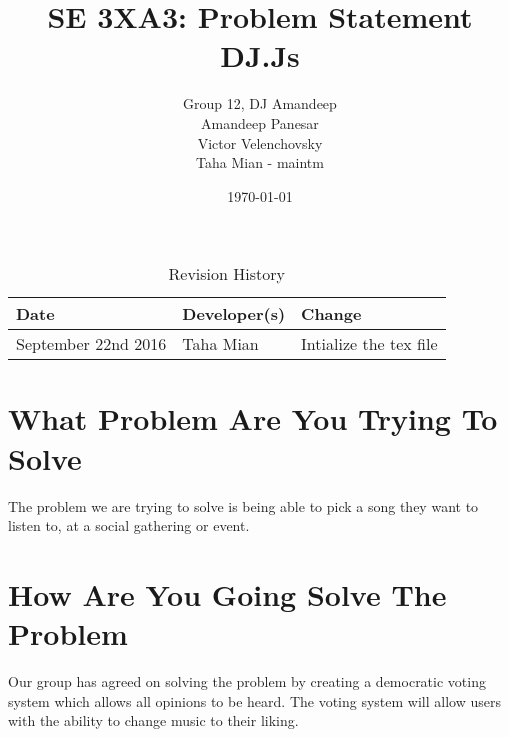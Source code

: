 \documentclass[11pt,fleqn]{article}
\title{SE 3XA3: Problem Statement\\DJ.Js}
\author{Group 12, DJ Amandeep\\
Amandeep Panesar \\ Victor Velenchovsky \\ Taha Mian - maintm}
\date{\today}
\begin{document}
\begin{table}[hp]
\caption{Revision History} \label{TblRevisionHistory}
\begin{tabularx}{\textwidth}{llX}
\toprule
\textbf{Date} & \textbf{Developer(s)} & \textbf{Change}\\
\midrule
September 22nd 2016 & Taha Mian & Intialize the tex file\\

\bottomrule
\end{tabularx}
\end{table}
\maketitle
\section{What Problem Are You Trying To Solve}
The problem we are trying to solve is being able to pick a song they want to listen to, at a social gathering or event.
\section{How Are You Going Solve The Problem}
Our group has agreed on solving the problem by creating a democratic voting system which allows all opinions to be heard. The voting system will allow users with the ability to change music to their liking.
\end{document}

